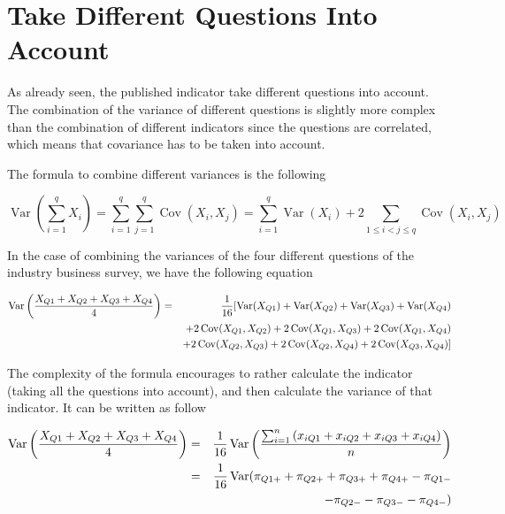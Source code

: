 \documentclass[12pt,a4paper,oneside]{book}
\DeclareMathOperator{\Var}{Var}
\DeclareMathOperator{\Cov}{Cov}
\begin{document}
\section{Take Different Questions Into Account}

As already seen, the published indicator take different questions into account. 
The combination of the variance of different questions is slightly more complex than the combination of different indicators since the questions are correlated, which means that covariance has to be taken into account.

The formula to combine different variances is the following

\begin{equation}
\Var \left(\sum_{i=1}^{q} X_{i}\right) = \sum_{i=1}^{q} \sum_{j=1}^{q} \Cov\left(X_{i}, X_{j}\right)
= \sum_{i=1}^{q} \Var\left(X_{i}\right)+2 \sum_{1 \leq i<j \leq q} \Cov\left(X_{i}, X_{j}\right)
\end{equation} 

In the case of combining the variances of the four different questions of the industry business survey, we have the following equation

\begin{eqnarray}
    \Var \left(\frac{X_{Q1} + X_{Q2} + X_{Q3} + X_{Q4}}{4} \right) &=& \frac{1}{16} \large[ \Var(X_{Q1}) + \Var(X_{Q2}) + \Var(X_{Q3}) + \Var(X_{Q4}) \nonumber \\
    && + 2 \Cov (X_{Q1},X_{Q2}) + 2 \Cov (X_{Q1},X_{Q3}) + 2 \Cov (X_{Q1},X_{Q4}) \nonumber \\
    &&  + 2 \Cov (X_{Q2},X_{Q3}) + 2 \Cov (X_{Q2},X_{Q4}) + 2 \Cov (X_{Q3},X_{Q4}) \large] \nonumber \\
\end{eqnarray}

The complexity of the formula encourages to rather calculate the indicator (taking all the questions into account), and then calculate the variance of that indicator. It can be written as follow

\begin{eqnarray}
    \Var \left(\frac{X_{Q1} + X_{Q2} + X_{Q3} + X_{Q4}}{4} \right) 
    &=& \frac{1}{16} \Var \left(\frac{\sum_{i=1}^n \left(x_{i Q1} + x_{i Q2} + x_{i Q3} + x_{i Q4} \right)}{n} \right) \nonumber \\
    &=& \frac{1}{16} \Var \Large(\pi_{Q1+} + \pi_{Q2+} + \pi_{Q3+} + \pi_{Q4+} - \pi_{Q1-} \nonumber \\
&& - \pi_{Q2-} - \pi_{Q3-} - \pi_{Q4-}  \Large) 
\end{eqnarray}
\end{document}
